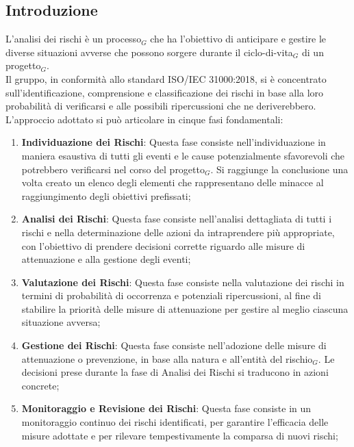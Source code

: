 \documentclass[10pt]{article}
\begin{document}
    \subsection{Introduzione}
    \label{introduzione-analisi}
    L'analisi dei rischi è un processo$_G$ che ha l'obiettivo di anticipare e gestire le diverse situazioni avverse che possono sorgere durante il ciclo-di-vita$_G$ di un progetto$_G$.\\
    Il gruppo, in conformità allo standard ISO/IEC 31000:2018, si è concentrato sull'identificazione, comprensione e classificazione dei rischi in base alla loro probabilità di verificarsi e alle possibili ripercussioni che ne deriverebbero.\\ 
    L'approccio adottato si può articolare in cinque fasi fondamentali:
    \begin{enumerate}
        \item \textbf{Individuazione dei Rischi}:
        Questa fase consiste nell'individuazione in maniera esaustiva di tutti gli eventi e le cause potenzialmente sfavorevoli che potrebbero verificarsi nel corso del progetto$_G$. Si raggiunge la conclusione una volta creato un elenco degli elementi che rappresentano delle minacce al raggiungimento degli obiettivi prefissati;
        \item \textbf{Analisi dei Rischi}:
        Questa fase consiste nell'analisi dettagliata di tutti i rischi e nella determinazione delle azioni da intraprendere più appropriate, con l'obiettivo di prendere decisioni corrette riguardo alle misure di attenuazione e alla gestione degli eventi;
        \item \textbf{Valutazione dei Rischi}:
        Questa fase consiste nella valutazione dei rischi in termini di probabilità di occorrenza e potenziali ripercussioni, al fine di stabilire la priorità delle misure di attenuazione per gestire al meglio ciascuna situazione avversa;
        \item \textbf{Gestione dei Rischi}:
        Questa fase consiste nell'adozione delle misure di attenuazione o prevenzione, in base alla natura e all'entità del rischio$_G$. Le decisioni prese durante la fase di Analisi dei Rischi si traducono in azioni concrete;
        \item \textbf{Monitoraggio e Revisione dei Rischi}:
        Questa fase consiste in un monitoraggio continuo dei rischi identificati, per garantire l'efficacia delle misure adottate e per rilevare tempestivamente la comparsa di nuovi rischi;
    \end{enumerate}
\end{document}
